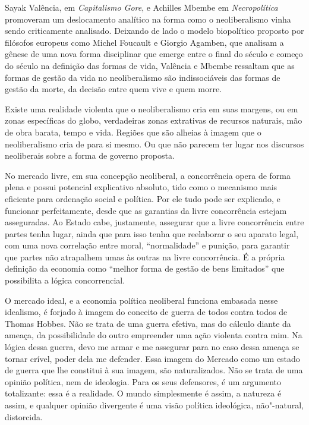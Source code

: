 Sayak Valência, em \emph{Capitalismo Gore}, e Achilles Mbembe em
\emph{Necropolítica} promoveram um deslocamento analítico na forma como
o neoliberalismo vinha sendo criticamente analisado. Deixando de lado o
modelo biopolítico proposto por filósofos europeus como Michel Foucault
e Giorgio Agamben, que analisam a gênese de uma nova forma disciplinar
que emerge entre o final do século  e começo do século  na
definição das formas de vida, Valência e Mbembe ressaltam que as formas
de gestão da vida no neoliberalismo são indissociáveis das formas de
gestão da morte, da decisão entre quem vive e quem morre.

Existe uma realidade violenta que o neoliberalismo cria em suas margens,
ou em zonas específicas do globo, verdadeiras zonas extrativas de
recursos naturais, mão de obra barata, tempo e vida. Regiões que são
alheias à imagem que o neoliberalismo cria de para si mesmo. Ou que não
parecem ter lugar nos discursos neoliberais sobre a forma de governo
proposta.

\asterisc

No mercado livre, em sua concepção neoliberal, a concorrência opera de
forma plena e possui potencial explicativo absoluto, tido como o
mecanismo mais eficiente para ordenação social e política. Por ele tudo
pode ser explicado, e funcionar perfeitamente, desde que as garantias da
livre concorrência estejam asseguradas. Ao Estado cabe, justamente,
assegurar que a livre concorrência entre partes tenha lugar, ainda que
para isso tenha que reelaborar o seu aparato legal, com uma nova
correlação entre moral, ``normalidade'' e punição, para garantir que
partes não atrapalhem umas às outras na livre concorrência. É a própria
definição da economia como ``melhor forma de gestão de bens limitados''
que possibilita a lógica concorrencial.

O mercado ideal, e a economia política neoliberal funciona embasada
nesse idealismo, é forjado à imagem do conceito de guerra de todos
contra todos de Thomas Hobbes. Não se trata de uma guerra efetiva, mas
do cálculo diante da ameaça, da possibilidade do outro empreender uma
ação violenta contra mim. Na lógica dessa guerra, devo me armar e me
assegurar para no caso dessa ameaça se tornar crível, poder dela me
defender. Essa imagem do Mercado como um estado de guerra que lhe
constitui à sua imagem, são naturalizados. Não se trata de uma opinião
política, nem de ideologia. Para os seus defensores, é um argumento
totalizante: essa é a realidade. O mundo simplesmente é assim, a
natureza é assim, e qualquer opinião divergente é uma visão política
ideológica, não"-natural, distorcida.

